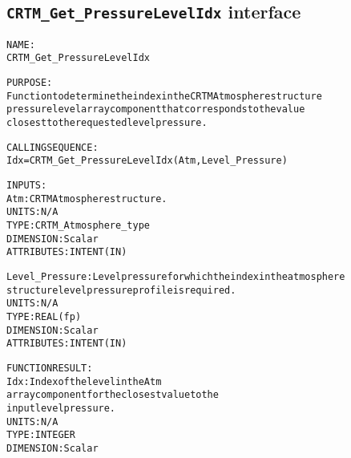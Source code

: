 \subsection{\texttt{CRTM\_Get\_PressureLevelIdx} interface}
  \label{sec:CRTM_Get_PressureLevelIdx_interface}
  \begin{alltt}
 
  NAME:
        CRTM_Get_PressureLevelIdx
 
  PURPOSE:
        Function to determine the index in the CRTM Atmosphere structure
        pressure level array component that corresponds to the value
        closest to the requested level pressure.
 
  CALLING SEQUENCE:
        Idx = CRTM_Get_PressureLevelIdx(Atm, Level_Pressure)
 
  INPUTS:
        Atm:             CRTM Atmosphere structure.
                         UNITS:      N/A
                         TYPE:       CRTM_Atmosphere_type
                         DIMENSION:  Scalar
                         ATTRIBUTES: INTENT(IN)
 
        Level_Pressure:  Level pressure for which the index in the atmosphere
                         structure level pressure profile is required.
                         UNITS:      N/A
                         TYPE:       REAL(fp)
                         DIMENSION:  Scalar
                         ATTRIBUTES: INTENT(IN)
 
  FUNCTION RESULT:
        Idx:             Index of the level in the Atm%Level_Pressure
                         array component for the closest value to the
                         input level pressure.
                         UNITS:      N/A
                         TYPE:       INTEGER
                         DIMENSION:  Scalar
 
  \end{alltt}
